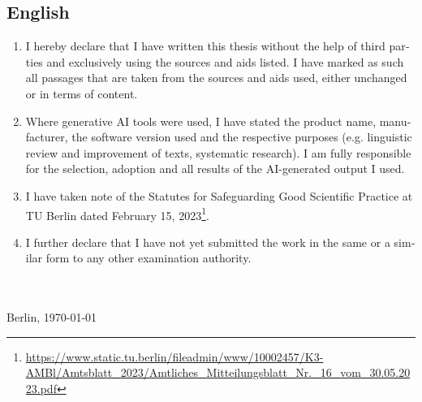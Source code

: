 {\begin{otherlanguage}{english}
\section*{English}
\begin{enumerate}[noitemsep]
\item I hereby declare that I have written this thesis without the help of third parties and exclusively using the sources and aids listed. I have marked as such all passages that are taken from the sources and aids used, either unchanged or in terms of content.
\item Where generative AI tools were used, I have stated the product name, manufacturer, the software version used and the respective purposes (e.g. linguistic review and improvement of texts, systematic research). I am fully responsible for the selection, adoption and all results of the AI-generated output I used.
\item I have taken note of the Statutes for Safeguarding Good Scientific Practice at TU Berlin dated February 15, 2023\footnote{\url{https://www.static.tu.berlin/fileadmin/www/10002457/K3-AMBl/Amtsblatt_2023/Amtliches_Mitteilungsblatt_Nr._16_vom_30.05.2023.pdf}}.
\item I further declare that I have not yet submitted the work in the same or a similar form to any other examination authority.
\end{enumerate}
\vspace*{4ex}
\makebox[3in][l]{\hrulefill}\\
\textsc{\autor} \\
Berlin, \today
\end{otherlanguage}
}